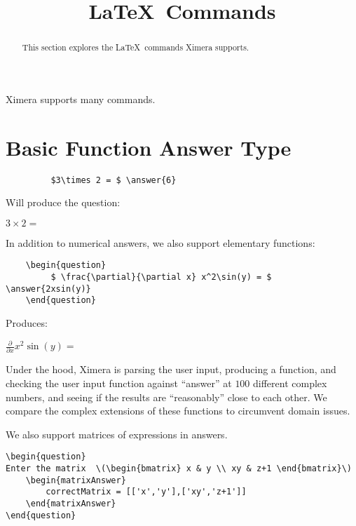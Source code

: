 \documentclass{ximera}
\title{\LaTeX\ Commands}
\begin{document}
\begin{abstract}
  This section explores the \LaTeX\ commands Ximera supports. 
\end{abstract}

\maketitle

Ximera supports many commands.


\section{Basic Function Answer Type}

\begin{verbatim}
         $3\times 2 = $ \answer{6}
\end{verbatim}

Will produce the question:

\begin{question}
  $3\times 2 = $ 
\end{question}


In addition to numerical answers, we also support elementary functions:

\begin{verbatim}
    \begin{question}
         $ \frac{\partial}{\partial x} x^2\sin(y) = $ \answer{2xsin(y)}
    \end{question}
\end{verbatim}

Produces:

\begin{question}
  $ \frac{\partial}{\partial x} x^2\sin(y) = $ 
\end{question}

\begin{remark}
Under the hood, Ximera is parsing the user input, producing a
function, and checking the user input function against ``answer'' at
$100$ different complex numbers, and seeing if the results are
``reasonably'' close to each other.  We compare the complex extensions
of these functions to circumvent domain issues.
\end{remark}

We also support matrices of expressions in answers.

\begin{verbatim}
\begin{question}
Enter the matrix  \(\begin{bmatrix} x & y \\ xy & z+1 \end{bmatrix}\)
    \begin{matrixAnswer}
	    correctMatrix = [['x','y'],['xy','z+1']]
    \end{matrixAnswer}
\end{question}
\end{verbatim}
\end{document}
